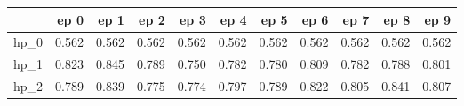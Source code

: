 \begin{tabular}{lrrrrrrrrrr}
\toprule
{} &   ep 0 &   ep 1 &   ep 2 &   ep 3 &   ep 4 &   ep 5 &   ep 6 &   ep 7 &   ep 8 &   ep 9 \\
\midrule
hp\_0 &  0.562 &  0.562 &  0.562 &  0.562 &  0.562 &  0.562 &  0.562 &  0.562 &  0.562 &  0.562 \\
hp\_1 &  0.823 &  0.845 &  0.789 &  0.750 &  0.782 &  0.780 &  0.809 &  0.782 &  0.788 &  0.801 \\
hp\_2 &  0.789 &  0.839 &  0.775 &  0.774 &  0.797 &  0.789 &  0.822 &  0.805 &  0.841 &  0.807 \\
\bottomrule
\end{tabular}
